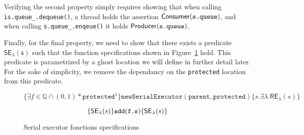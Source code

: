 Verifying the second property simply requires showing that when calling \texttt{is.queue\_.dequeue()}, a thread holds the assertion $\mathsf{Consumer}(\texttt{s.queue})$, and when calling \texttt{s.queue\_.enqeue()} it holds $\mathsf{Producer}(\texttt{s.queue})$.

Finally, for the final property, we need to show that there exists a predicate $\mathsf{SE_{\lambda}(s)}$ such that the function specifications shown in Figure~\ref{fig:seFctSpec} hold. This predicate is parametrized by a ghost location we will define in further detail later. For the sake of simplicity, we remove the dependancy on the \texttt{protected} location from this predicate.

\begin{figure}
\[
		\{\exists f \in \mathbb{Q} \cap (0, 1) * \texttt{protected}^1\} \mathtt{newSerialExecutor(parent, protected)} \{s. \exists \lambda. \mathsf{RE}_\lambda (s)\}
\]

\[
		\{\mathsf{SE}_\lambda(s)\} \mathtt{add(f, s)} \{\mathsf{SE}_\lambda(s)\}				
\]

		\caption{Serial executor fonctions specifications}
		\label{fig:seFctSpec}
\end{figure}
